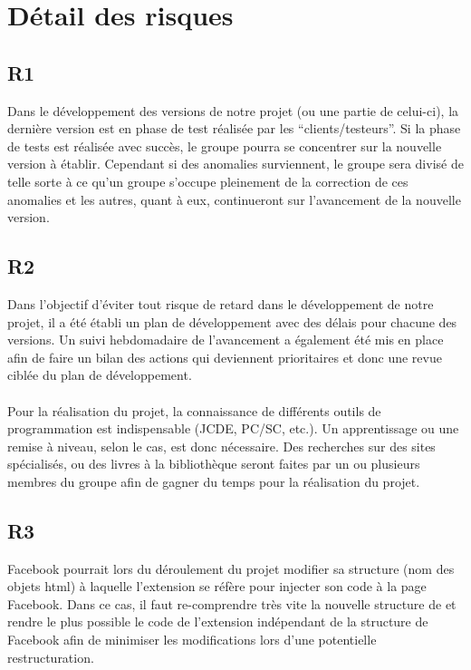 \documentclass[a4paper,11pt,french]{article}
\begin{document}
\clearpage
\section{Détail des risques}

\subsection*{R1}
Dans le développement des versions de notre projet (ou une partie de celui-ci),
la dernière version est en phase de test réalisée par les ``clients/testeurs''.
Si la phase de tests est réalisée avec succès, le groupe pourra se concentrer
sur la nouvelle version à établir. Cependant si des anomalies surviennent, le
groupe sera divisé de telle sorte à ce qu'un groupe s'occupe pleinement de la
correction de ces anomalies et les autres, quant à eux, continueront sur
l'avancement de la nouvelle version.

\subsection*{R2}
Dans l'objectif d'éviter tout risque de retard dans le développement de notre
projet, il a été établi un plan de développement avec des délais pour chacune
des versions. Un suivi hebdomadaire de l'avancement a également été mis en place
afin de faire un bilan des actions qui deviennent prioritaires et donc une revue
ciblée du plan de développement.
\paragraph{}
Pour la réalisation du projet, la connaissance de différents outils de
programmation est indispensable (JCDE, PC/SC, etc.). Un apprentissage ou
une remise à niveau, selon le cas, est donc nécessaire. Des recherches sur des
sites spécialisés, ou des livres à la bibliothèque seront faites par un ou
plusieurs membres du groupe afin de gagner du temps pour la réalisation du
projet.

\subsection*{R3}
Facebook pourrait lors du déroulement du projet modifier sa structure
(nom des objets html) à laquelle l'extension se réfère pour injecter son code à la page Facebook. 
Dans ce cas, il faut re-comprendre très vite la nouvelle structure de
et rendre le plus possible le code de l'extension indépendant de la
structure de Facebook afin de
minimiser les modifications lors d'une potentielle restructuration.
\end{document}
